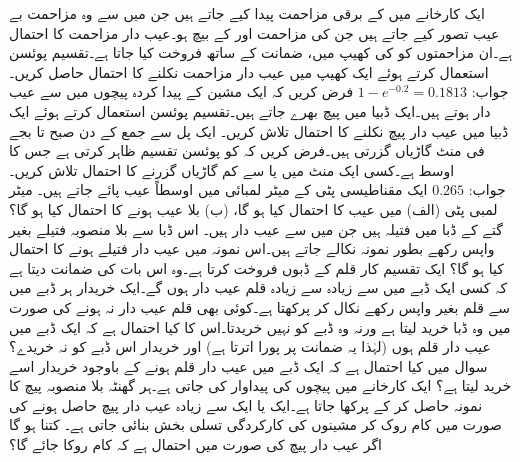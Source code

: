 \quad
ایک کارخانے میں  کے برقی مزاحمت پیدا کیے جاتے ہیں جن میں سے وہ مزاحمت بے عیب تصور کیے جاتے ہیں جن کی مزاحمت  اور  کے بیچ ہو۔عیب دار مزاحمت کا احتمال  ہے۔ان مزاحمتوں کو  کی کھیپ میں، ضمانت کے ساتھ فروخت کیا جاتا ہے۔تقسیم پوئسن استعمال کرتے ہوئے ایک کھیپ میں عیب دار مزاحمت نکلنے کا احتمال حاصل کریں۔\\
جواب:\quad
$1-e^{-0.2}=0.1813$
\quad
فرض کریں کہ ایک مشین کے پیدا کردہ پیچوں میں سے   عیب دار ہوتے ہیں۔ایک ڈبیا میں  پیچ بھرے جاتے ہیں۔تقسیم پوئسن استعمال کرتے ہوئے ایک ڈبیا میں  عیب دار پیچ نکلنے کا احتمال تلاش کریں۔
\quad
ایک پل سے جمع کے دن صبح  تا  بجے  فی منٹ  گاڑیاں گزرتی ہیں۔فرض کریں کہ  کو پوئسن تقسیم ظاہر کرتی ہے جس کا اوسط  ہے۔کسی ایک منٹ میں  یا  سے کم گاڑیاں گزرنے کا احتمال تلاش کریں۔\\
جواب:\quad
$0.265$
\quad
ایک مقناطیسی پٹی کے  میٹر لمبائی میں اوسطاً  عیب پائے جاتے ہیں۔  میٹر لمبی پٹی (الف) میں  عیب کا احتمال کیا ہو گا، (ب) بلا عیب ہونے کا احتمال کیا ہو گا؟ 
\quad
گتے کے ڈبا میں  فتیلہ ہیں جن میں سے  عیب دار ہیں۔ اس ڈبا سے بلا منصوبہ  فتیلے بغیر واپس رکھے  بطور نمونہ نکالے جاتے ہیں۔اس نمونہ میں  عیب دار فتیلے ہونے کا احتمال کیا ہو گا؟
\quad
ایک  تقسیم کار  قلم کے ڈبوں فروخت کرتا ہے۔وہ اس بات کی ضمانت دیتا ہے کہ کسی ایک ڈبے میں سے زیادہ سے زیادہ  قلم عیب دار ہوں گے۔ایک خریدار ہر ڈبے میں سے  قلم بغیر واپس رکھے نکال کر پرکھتا ہے۔کوئی بھی قلم عیب دار نہ ہونے کی صورت میں وہ ڈبا خرید لیتا ہے ورنہ وہ ڈبے کو نہیں خریدتا۔اس کا کیا احتمال ہے کہ ایک ڈبے میں  عیب دار قلم ہوں (لہٰذا یہ ضمانت پر پورا اترتا ہے) اور خریدار اس ڈبے کو نہ خریدے؟
\quad
سوال  میں کیا احتمال ہے کہ ایک ڈبے میں  عیب دار قلم ہونے کے باوجود خریدار اسے خرید لیتا ہے؟
\quad
ایک کارخانے میں پیچوں کی پیداوار کی جاتی ہے۔ہر گھنٹہ بلا منصوبہ  پیچ کا نمونہ حاصل کر کے پرکھا جاتا ہے۔ایک یا ایک سے زیادہ عیب دار پیچ حاصل ہونے کی صورت میں کام روک کر مشینوں کی کارکردگی تسلی بخش بنائی جاتی ہے۔ کتنا ہو گا اگر   عیب دار پیچ کی صورت میں  احتمال ہے کہ کام روکا جائے گا؟  
